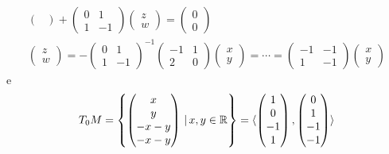 \documentclass[a4paper]{article}
\begin{document}
\begin{snippetexample}{}
\begin{align*}
\begin{pmatrix}
        \end{pmatrix}
        + \begin{pmatrix}
            0 & 1 \\ 1 & -1
        \end{pmatrix}
        \begin{pmatrix}
            z \\ w
        \end{pmatrix} = \begin{pmatrix}
            0 \\ 0
        \end{pmatrix} \\
        \begin{pmatrix}
            z \\ w
        \end{pmatrix} = {-\begin{pmatrix}
            0 & 1 \\ 1 & -1
        \end{pmatrix}}^{-1}
        \begin{pmatrix}
            -1 & 1 \\ 2 & 0
        \end{pmatrix}
        \begin{pmatrix}
            x \\ y
        \end{pmatrix} = \cdots = \begin{pmatrix}
            -1 & -1 \\ 1 & -1
        \end{pmatrix}
        \begin{pmatrix}
            x \\ y
        \end{pmatrix}
    \end{align*}
    e
    \[
        T_0 M = \left\{
            \begin{pmatrix}
                x \\ y \\ -x-y \\ -x-y
            \end{pmatrix} \,|\, x,y \in \mathbb{R}
        \right\} = \langle \begin{pmatrix}
            1 \\ 0 \\ -1 \\ 1
        \end{pmatrix}, \begin{pmatrix}
            0 \\ 1 \\ -1 \\ -1
        \end{pmatrix} \rangle
    \]
\end{snippetexample}
\end{document}
